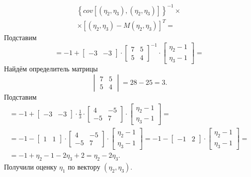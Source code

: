 \begin{enumerate}[label=\alph*)]
\begin{gather*}
    \left\{
      cov \left[
        \left( \eta_2, \eta_3 \right), \left( \eta_2, \eta_3 \right)
      \right]
    \right\}^{-1} \times \\
    \times \left[
      \left( \eta_2, \eta_3 \right) - M \left( \eta_2, \eta_3 \right)
    \right]^T =
  \end{gather*}
  Подставим
  \begin{equation*}
    = -1 +
    \begin{bmatrix}
      -3 & -3
    \end{bmatrix} \cdot
    \begin{bmatrix}
      7 & 5 \\
      5 & 4
    \end{bmatrix}^{-1} \cdot
    \begin{bmatrix}
      \eta_2 - 1 \\
      \eta_3 - 1
    \end{bmatrix} =
  \end{equation*}
  Найдём определитель матрицы
  \begin{equation*}
    \begin{vmatrix}
      7 & 5 \\
      5 & 4
    \end{vmatrix} =
    28 - 25 =
    3.
  \end{equation*}
  Подставим
  \begin{gather*}
    = -1 +
    \begin{bmatrix}
      -3 & -3
    \end{bmatrix} \cdot \frac{1}{3} \cdot
    \begin{bmatrix}
      4 & -5 \\
      -5 & 7
    \end{bmatrix} \cdot
    \begin{bmatrix}
      \eta_2 - 1 \\
      \eta_3 - 1
    \end{bmatrix} = \\
    = -1 -
    \begin{bmatrix}
      1 & 1
    \end{bmatrix} \cdot
    \begin{bmatrix}
      4 & -5 \\
      -5 & 7
    \end{bmatrix} \cdot
    \begin{bmatrix}
      \eta_2 - 1 \\
      \eta_3 - 1
    \end{bmatrix} =
    -1 -
    \begin{bmatrix}
      -1 & 2
    \end{bmatrix} \cdot
    \begin{bmatrix}
      \eta_2 - 1 \\
      \eta_3 - 1
    \end{bmatrix} = \\
    = -1 + \eta_2 - 1 - 2 \eta_3 + 2 =
    \eta_2 - 2 \eta_3.
  \end{gather*}
  Получили оценку $ \eta_1 $ по вектору $ \left( \eta_2, \eta_3 \right) $.
\end{enumerate}

